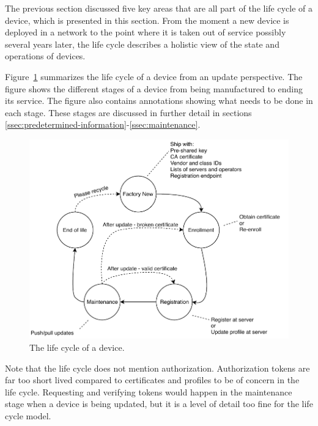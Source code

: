 \documentclass[0-thesis.tex]{subfiles}
\begin{document}
The previous section discussed five key areas that are all part of the life cycle of a
device, which is presented in this section. From the moment a new device is deployed in a
network to the point where it is taken out of service possibly several years later, the
life cycle describes a holistic view of the state and operations of devices.

Figure~\ref{fig:lifecycle} summarizes the life cycle of a device from an update
perspective. The figure shows the different stages of a device from being manufactured to
ending its service. The figure also contains annotations showing what needs to be done in
each stage. These stages are discussed in further detail in sections
\ref{ssec:predetermined-information}-\ref{ssec:maintenance}. 

\begin{figure}[t]
    \caption{The life cycle of a device.}
    \label{fig:lifecycle}
    \includegraphics{images/lifecycle.pdf}
\end{figure}

Note that the life cycle does not mention authorization. Authorization tokens are far too
short lived compared to certificates and profiles to be of concern in the life cycle.
Requesting and verifying tokens would happen in the maintenance stage when a device is
being updated, but it is a level of detail too fine for the life cycle model.
\end{document}
